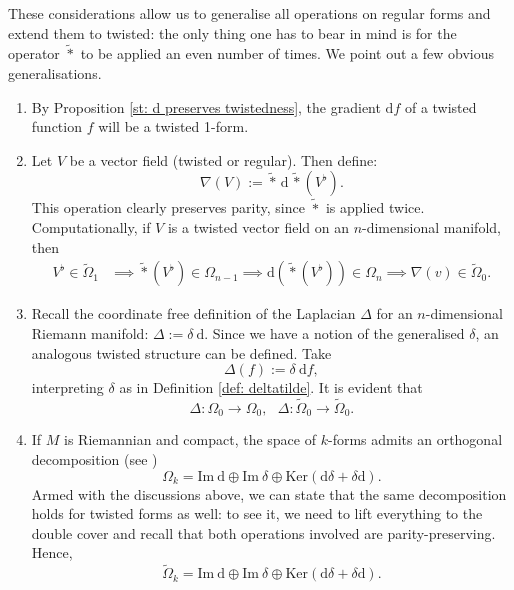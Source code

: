 \documentclass[11pt,twoside]{article}
\theoremstyle{definition}
\numberwithin{equation}{section}
\def\d{\mathrm{d}}
\begin{document}
 These considerations allow us to generalise all operations on regular forms and extend them to twisted: the only thing one has to bear in mind is for the operator $\widetilde{\ast}$ to be applied an even number of times.  We point out a few obvious generalisations.
 \begin{enumerate}
     \item By Proposition \ref{st: d preserves twistedness}, the gradient $\mathrm{d} f$ of a twisted function $f$ will be a twisted  1-form. 
     \item Let  $V$ be a vector field (twisted or regular). Then define:
        \[
       \nabla(V):= \widetilde{\ast}\,\mathrm{d}\,\widetilde{\ast}(V^{\flat}).
        \]
       This operation clearly preserves parity, since $\widetilde{\ast}$ is applied twice. Computationally, if $V$ is a twisted vector field on an $n$-dimensional manifold, then 
        \begin{equation*}
            \begin{split}
                V^{\flat}\in\widetilde{\Omega}_1 &\implies \widetilde{\ast}\left(V^{\flat}\right)\in \Omega_{n-1}\implies \mathrm{d}\left(\widetilde{\ast}\left(V^{\flat}\right)\right)\in\Omega_n\implies {\nabla}(v)\in\widetilde{\Omega}_0. 
            \end{split}
        \end{equation*}
        \item Recall the coordinate free definition of the Laplacian  $\Delta$ for an $n$-dimensional Riemann manifold: $\Delta := \delta \  \mathrm{d}$. Since we have a notion of the generalised $\delta$, an analogous twisted structure can be defined. Take 
\begin{equation} 
\label{eq: twisted delta}
\Delta(f):= \delta \ \mathrm{d} f, 
\end{equation}
interpreting $\delta$ as in Definition \ref{def: deltatilde}. It is evident that 
\[
\Delta:\Omega_0\to\Omega_0, \ \ \ \Delta:\widetilde{\Omega}_0\to\widetilde{\Omega}_0.
\]
\item If $M$ is Riemannian and compact, the space of $k$-forms admits an orthogonal decomposition (see \cite{GR-G-K-2024, wells1980differential})
\[
\Omega_k = \mathrm{Im} \ \mathrm{d}\oplus\mathrm{Im}\ \delta\oplus\mathrm{Ker} \left(\d \delta+ \delta\d\right).
\]
Armed with the discussions above, we can state that the same decomposition holds for twisted forms as well: to see it, we need to lift everything to the double cover and recall that both operations involved are parity-preserving. Hence,
\[
\widetilde{\Omega}_k = \mathrm{Im} \ \mathrm{d}\oplus\mathrm{Im}\ \delta\oplus\mathrm{Ker} \left(\d \delta+ \delta\d\right).
\]
 \end{enumerate}
\end{document}
